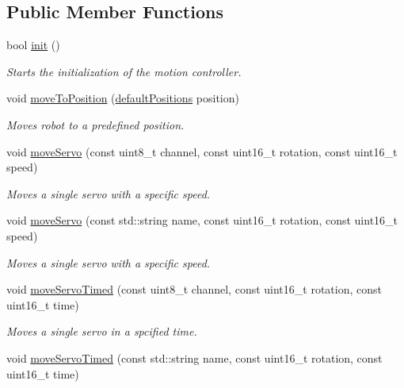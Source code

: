 \subsection*{Public Member Functions}
\begin{DoxyCompactItemize}
\item 
bool \hyperlink{class_motion_control_af101a2f120d4e5a08c540d83ef078768}{init} ()
\begin{DoxyCompactList}\small\item\em Starts the initialization of the motion controller. \end{DoxyCompactList}\item 
void \hyperlink{class_motion_control_ae348a531c3fe5a5d8d729e1dd2387f7f}{move\+To\+Position} (\hyperlink{_motion_control_8hpp_ac70e3c2821eb6a3860441f2c682f0aa4}{default\+Positions} position)
\begin{DoxyCompactList}\small\item\em Moves robot to a predefined position. \end{DoxyCompactList}\item 
void \hyperlink{class_motion_control_a69e807208c6fffd7c4b7c7159792c3e9}{move\+Servo} (const uint8\+\_\+t channel, const uint16\+\_\+t rotation, const uint16\+\_\+t speed)
\begin{DoxyCompactList}\small\item\em Moves a single servo with a specific speed. \end{DoxyCompactList}\item 
void \hyperlink{class_motion_control_a0acba77f349d42609ed2c0e520b8cf08}{move\+Servo} (const std\+::string name, const uint16\+\_\+t rotation, const uint16\+\_\+t speed)
\begin{DoxyCompactList}\small\item\em Moves a single servo with a specific speed. \end{DoxyCompactList}\item 
void \hyperlink{class_motion_control_a13582b1d506a7e85b23efaa9750ba0c8}{move\+Servo\+Timed} (const uint8\+\_\+t channel, const uint16\+\_\+t rotation, const uint16\+\_\+t time)
\begin{DoxyCompactList}\small\item\em Moves a single servo in a spcified time. \end{DoxyCompactList}\item 
void \hyperlink{class_motion_control_af2e8c8ede76ded5423deeddffa20ea52}{move\+Servo\+Timed} (const std\+::string name, const uint16\+\_\+t rotation, const uint16\+\_\+t time)

\end{DoxyCompactItemize}
